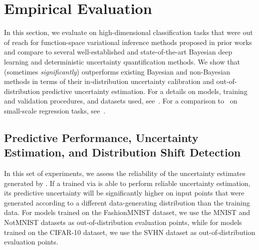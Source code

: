 %

%
\section{Empirical Evaluation}
\label{sec:experiments}
\vspace*{-3pt}

In this section, we evaluate \fsvi on high-dimensional classification tasks that were out of reach for function-space variational inference methods proposed in prior works and compare \fsvi to several well-established and state-of-the-art Bayesian deep learning and deterministic uncertainty quantification methods.
We show that \fsvi (sometimes \emph{significantly}) outperforms existing Bayesian and non-Bayesian methods in terms of their in-distribution uncertainty calibration and out-of-distribution predictive uncertainty estimation.
For a details on models, training and validation procedures, and datasets used, see~.
For a comparison to~\citet{sun2019fbnn} on small-scale regression tasks, see~.
%



%

%
%
%
%
%
%





%



%
%
%

%
%
%


%
%
%
%
%
%
%
%



%


\vspace{-3pt}
\subsection{Predictive Performance, Uncertainty Estimation, and Distribution Shift Detection}
\label{sec:exps_setup}
\vspace*{-3pt}

In this set of experiments, we assess the reliability of the uncertainty estimates generated by \fsvi.
If a \bnn trained via \fsvi is able to perform reliable uncertainty estimation, its predictive uncertainty will be significantly higher on input points that were generated according to a different data-generating distribution than the training data.
For models trained on the FashionMNIST dataset, we use the MNIST and NotMNIST datasets as out-of-distribution evaluation points, while for models trained on the CIFAR-10 dataset, we use the SVHN dataset as out-of-distribution evaluation points.

